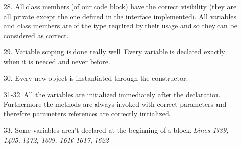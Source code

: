 \begin{itemize}
\item [28.] All class members (of our code block) have the correct visibility (they are all private except the one defined in the interface implemented). All variables and class members are of the type required by their usage and so they can be considered as correct.
\item [29.] Variable scoping is done really well. Every variable is declared exactly when it is needed and never before.
\item [30.] Every new object is instantiated through the constructor.
\item [31-32.] All the variables are initialized immediately after the declaration. Furthermore the methods are always invoked with correct parameters and therefore parameters references are correctly initialized.
\item [33.] Some variables aren't declared at the beginning of a block. \textit{Lines 1339, 1405, 1472, 1609, 1616-1617, 1622}
\end{itemize}